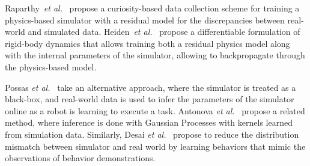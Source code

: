 Raparthy~\emph{et al.}~\cite{Raparthy:2020aa} propose a curiosity-based data collection scheme  for training a physics-based simulator with a residual model for the discrepancies between real-world and simulated data. Heiden~\emph{et al.}~\cite{Heiden:2020aa} propose a differentiable formulation of rigid-body dynamics that allows training both a residual physics model along with the internal parameters of the simulator, allowing to backpropagate through the physics-based model.


Possas \emph{et al.}~\cite{Possas:2020aa} take an alternative approach, where the simulator is treated as a black-box, and real-world data is used to infer the parameters of the simulator online as a robot is learning to execute a task. Antonova \emph{et al.}~\cite{Antonova:2020aa} propose a related method, where inference is done with Gaussian Processes with kernels learned from simulation data.
Similarly, Desai \emph{et al.}~\cite{Desai:2020aa} propose to reduce the distribution mismatch between  simulator and real world by learning behaviors that mimic the observations of behavior demonstrations.



